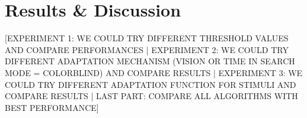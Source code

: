 \chapter{Results \& Discussion}
[EXPERIMENT 1: WE COULD TRY DIFFERENT THRESHOLD VALUES AND COMPARE PERFORMANCES | EXPERIMENT 2: WE COULD TRY DIFFERENT ADAPTATION MECHANISM (VISION OR TIME IN SEARCH MODE = COLORBLIND) AND COMPARE RESULTS | EXPERIMENT 3: WE COULD TRY DIFFERENT ADAPTATION FUNCTION FOR STIMULI AND COMPARE RESULTS | LAST PART: COMPARE ALL ALGORITHMS WITH BEST PERFORMANCE]